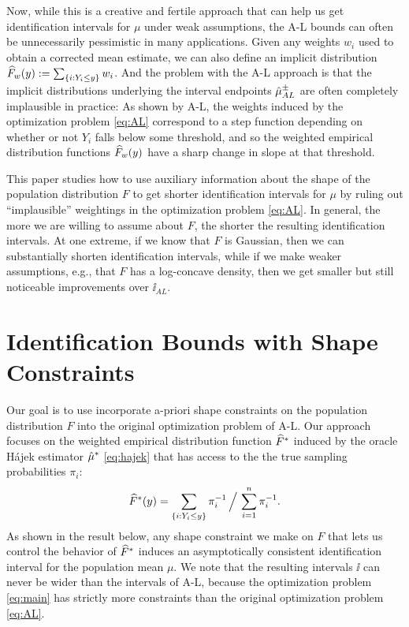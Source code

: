 \documentclass{article}
\theoremstyle{plain}
\theoremstyle{definition}
\theoremstyle{remark}
\begin{document}
Now, while this is a creative and fertile approach that can help us get identification intervals
for $\mu$ under weak assumptions, the A-L bounds can often be unnecessarily pessimistic in many
applications. Given any weights $w_i$ used to obtain a corrected mean estimate, we
can also define an implicit distribution $\widehat{F}_w(y) := \sum_{\left\{i : Y_i \leq y\right\}} w_i$.
And the problem with the A-L approach is that the implicit distributions underlying the
interval endpoints $\hat{\mu}_{AL}^{\pm}$ are often completely implausible in practice:
As shown by A-L, the weights induced by the optimization problem \eqref{eq:AL} correspond
to a step function depending on whether or not $Y_i$ falls below some threshold, and
so the weighted empirical distribution functions $\widehat{F}_w(y)$ have a sharp change in
slope at that threshold.

This paper studies how to use auxiliary information about the shape of the population
distribution $F$ to get shorter identification intervals for $\mu$ by ruling out ``implausible''
weightings in the optimization problem \eqref{eq:AL}. In general, the more we are willing to assume
about $F$, the shorter the resulting identification intervals. At one extreme, if we know that $F$
is Gaussian, then we can substantially shorten identification intervals, while if we make weaker
assumptions, e.g., that $F$ has a log-concave density, then we get smaller but still noticeable
improvements over $\ii_{AL}$.


\section{Identification Bounds with Shape Constraints}

Our goal is to use incorporate a-priori shape constraints on the population distribution $F$
into the original optimization problem of A-L. Our approach focuses on the weighted empirical
distribution function $\widehat{F}^*$ induced by the oracle H\'ajek estimator $\hat{\mu}^*$ \eqref{eq:hajek}
that has access to the the true sampling probabilities $\pi_i$:
\begin{equation}
\label{eq:oracle_distr}
\widehat{F}^*(y) = \sum_{\left\{i : Y_i \leq y\right\}} \pi^{-1}_i \, \Big/ \, \sum_{i = 1}^n \pi^{-1}_i.
\end{equation}
As shown in the result below, any shape constraint we make on $F$ that lets us control the
behavior of $\widehat{F}^*$ induces an asymptotically consistent identification interval for
the population mean $\mu$.
We note that the resulting intervals $\ii$ can never be wider than the intervals of
A-L, because the optimization problem \eqref{eq:main} has strictly more constraints than
the original optimization problem \eqref{eq:AL}.
\end{document}
